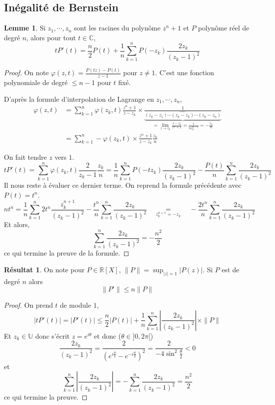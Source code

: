 \documentclass{article}
\theoremstyle{definition}
\newtheorem*{lmm}{Lemme}
\newtheorem*{res}{Résultat}
\begin{document}
\subsection{Inégalité de Bernstein}

\begin{lmm}
Si $z_1, \cdots, z_n$ sont les racines du polynôme $z^n+1$ et $P$ polynôme réel de degré $n$, alors pour tout $t\in\mathbb C$, \[
    tP'(t)=\frac n2P(t)+\frac 1n\sum_{k=1}^nP(-z_k)\frac{2z_k}{(z_k-1)^2}
\]
\end{lmm}

\begin{proof}
On note $\varphi(z, t)=\frac{P(tz)-P(t)}{z-1}$ pour $z\neq 1$. C'est une fonction polynomiale de degré $\leq n-1$ pour $t$ fixé.

D'après la formule d'interpolation de Lagrange en $z_1, \cdots, z_n$, \begin{align*}
    \varphi(z, t)&=\sum_{k=1}^n\varphi(z_k, t)\frac{z^n+1}{z-z_k} \times \underbrace{\frac1{(z_k-z_1)\cdots \widehat{(z_k-z_k)}\cdots (z_k-z_n)}}_{=\lim_{z\to z_k}\limits \frac{z-z_k}{z^n+1}=\frac1{nz_k^{n-1}}=-\frac{z_k}n} \\ &= \sum_{k=1}^n-\varphi(z_k, t)\times \frac{z^n+1}{z-z_k}\frac{z_k}n
\end{align*}

On fait tendre $z$ vers $1$. \[
    tP'(t)=\sum_{k=1}^n\varphi(z_k, t)\frac{2}{z_k-1}\frac{z_k}n= 
    \frac1n\sum_{k=1}^nP(-tz_k)\frac{2z_k}{(z_k-1)^2}-\frac{P(t)}{n}\sum_{k=1}^n\frac{2z_k}{(z_k-1)^2}
\]
Il nous reste à évaluer ce dernier terme. On reprend la formule précédente avec $P(t)=t^n$. \[
    nt^n=\frac1n\sum_{k=1}^n2t^n\frac{z_k^{n+1}}{(z_k-1)^2}-\frac{t^n}{n}\sum_{k=1}^n\frac{2z_k}{(z_k-1)^2}\quad \underset{z_k^{n+1}=-z_k}{=}\quad -\frac{2t^n}n\sum_{k=1}^n\frac{2z_k}{(z_k-1)^2}
\]
Et alors,
\[
\sum_{k=1}^n\frac{2z_k}{(z_k-1)^2}=-\frac{n^2}2
\]
ce qui termine la preuve de la formule.
\end{proof}

\begin{res}
On note pour $P\in\mathbb R[X]$, $\|P\|=\sup_{|z|=1}\limits|P(z)|$. Si $P$ est de degré $n$ alors \[
    \|P'\|\leq n\|P\|
\]
\end{res}

\begin{proof}
On prend $t$ de module $1$, \[
    |tP'(t)|=|P'(t)|\leq \frac n2|P(t)|+\frac1n\sum_{k=1}^n\left|\frac{2z_k}{(z_k-1)^2}\right|\times \|P\|
\]
Et $z_k\in\mathbb U$ donc s'écrit $z=e^{i\theta}$ et donc ($\theta\in ]0, 2\pi[$) \[
    \frac{2z_k}{(z_k-1)^2}=\frac{2}{(e^{i\frac \theta 2}-e^{-i\frac \theta2})^2}=\frac 2{-4\sin^2\frac\theta 2}<0
\]
et \[
    \sum_{k=1}^n\left|\frac{2z_k}{(z_k-1)^2}\right|=-\sum_{k=1}^n\frac{2z_k}{(z_k-1)^2}=\frac{n^2}2
\]
ce qui termine la preuve.
\end{proof}
\end{document}
